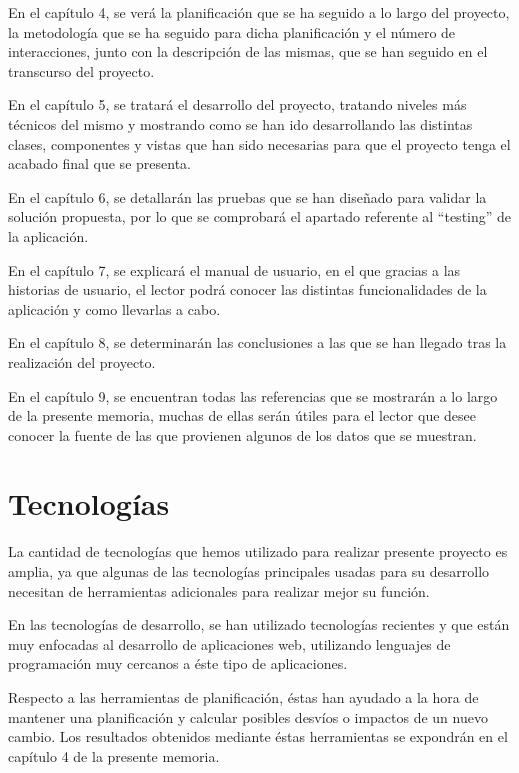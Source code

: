 \documentclass[11pt,openany]{book}
\begin{document}
En el capítulo 4, se verá la planificación que se ha seguido a lo largo del proyecto, la metodología que se ha seguido para dicha planificación y el número de interacciones, junto con la descripción de las mismas, que se han seguido en el transcurso del proyecto.

En el capítulo 5, se tratará el desarrollo del proyecto, tratando niveles más técnicos del mismo y mostrando como se han ido desarrollando las distintas clases, componentes y vistas que han sido necesarias para que el proyecto tenga el acabado final que se presenta.

En el capítulo 6, se detallarán las pruebas que se han diseñado para validar la solución propuesta, por lo que se comprobará el apartado referente al ``testing'' de la aplicación.

En el capítulo 7, se explicará el manual de usuario, en el que gracias a las historias de usuario, el lector podrá conocer las distintas funcionalidades de la aplicación y como llevarlas a cabo.

En el capítulo 8, se determinarán las conclusiones a las que se han llegado tras la realización del proyecto.

En el capítulo 9, se encuentran todas las referencias que se mostrarán a lo largo de la presente memoria, muchas de ellas serán útiles para el lector que desee conocer la fuente de las que provienen algunos de los datos que se muestran.


\chapter{Tecnologías}

La cantidad de tecnologías que hemos utilizado para realizar presente proyecto es amplia, ya que algunas de las tecnologías principales usadas para su desarrollo necesitan de herramientas adicionales para realizar mejor su función.

En las tecnologías de desarrollo, se han utilizado tecnologías recientes y que están muy enfocadas al desarrollo de aplicaciones web, utilizando lenguajes de programación muy cercanos a éste tipo de aplicaciones.

Respecto a las herramientas de planificación, éstas han ayudado a la hora de mantener una planificación y calcular posibles desvíos o impactos de un nuevo cambio. Los resultados obtenidos mediante éstas herramientas se expondrán en el capítulo 4 de la presente memoria.
\end{document}
